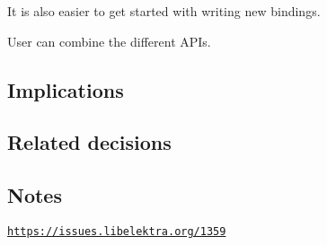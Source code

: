 \begin{DoxyEnumerate}
\item It is also easier to get started with writing new bindings.
\item User can combine the different A\+P\+Is.
\end{DoxyEnumerate}

\subsection*{Implications}

\subsection*{Related decisions}

\subsection*{Notes}

\href{https://issues.libelektra.org/1359}{\tt https\+://issues.\+libelektra.\+org/1359} 